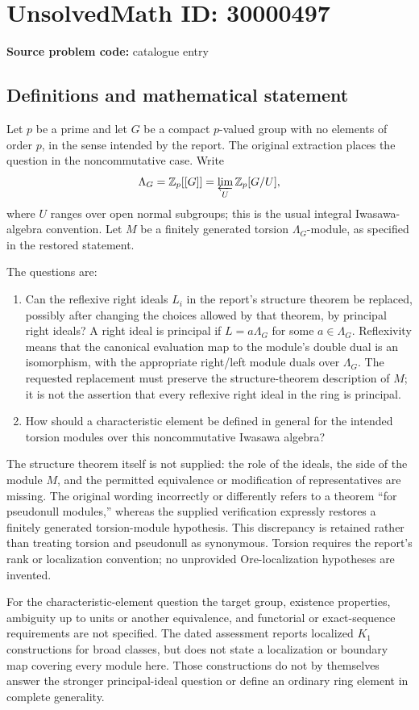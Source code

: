 \documentclass[11pt]{article}
\newcommand{\Z}{\mathbb{Z}}
\begin{document}
\section*{UnsolvedMath ID: 30000497}
\textbf{Source problem code:} catalogue entry
\subsection{Definitions and mathematical statement}
Let $p$ be a prime and let $G$ be a compact $p$-valued group with no elements of order $p$, in the sense intended by the report. The original extraction places the question in the noncommutative case. Write
\[
 \Lambda_G=\Z_p[[G]]
    =\varprojlim_{U}\Z_p[G/U],
\]
where $U$ ranges over open normal subgroups; this is the usual integral Iwasawa-algebra convention. Let $M$ be a finitely generated torsion $\Lambda_G$-module, as specified in the restored statement.

The questions are:
\begin{enumerate}
\item Can the reflexive right ideals $L_i$ in the report's structure theorem be replaced, possibly after changing the choices allowed by that theorem, by principal right ideals? A right ideal is principal if $L=a\Lambda_G$ for some $a\in\Lambda_G$. Reflexivity means that the canonical evaluation map to the module's double dual is an isomorphism, with the appropriate right/left module duals over $\Lambda_G$. The requested replacement must preserve the structure-theorem description of $M$; it is not the assertion that every reflexive right ideal in the ring is principal.
\item How should a characteristic element be defined in general for the intended torsion modules over this noncommutative Iwasawa algebra?
\end{enumerate}

The structure theorem itself is not supplied: the role of the ideals, the side of the module $M$, and the permitted equivalence or modification of representatives are missing. The original wording incorrectly or differently refers to a theorem ``for pseudonull modules,'' whereas the supplied verification expressly restores a finitely generated torsion-module hypothesis. This discrepancy is retained rather than treating torsion and pseudonull as synonymous. Torsion requires the report's rank or localization convention; no unprovided Ore-localization hypotheses are invented.

For the characteristic-element question the target group, existence properties, ambiguity up to units or another equivalence, and functorial or exact-sequence requirements are not specified. The dated assessment reports localized $K_1$ constructions for broad classes, but does not state a localization or boundary map covering every module here. Those constructions do not by themselves answer the stronger principal-ideal question or define an ordinary ring element in complete generality.
\end{document}
